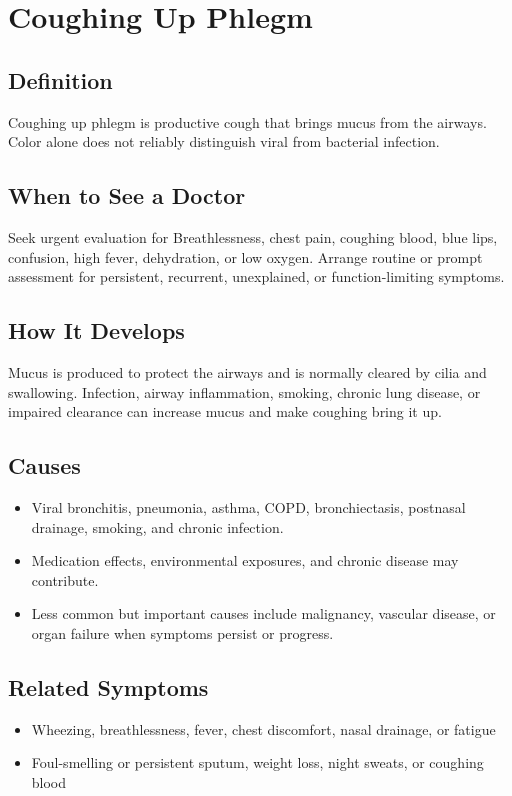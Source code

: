 \chapter{Coughing Up Phlegm}

\section*{Definition}
Coughing up phlegm is productive cough that brings mucus from the airways. Color alone does not reliably distinguish viral from bacterial infection.

\section*{When to See a Doctor}
Seek urgent evaluation for Breathlessness, chest pain, coughing blood, blue lips, confusion, high fever, dehydration, or low oxygen. Arrange routine or prompt assessment for persistent, recurrent, unexplained, or function-limiting symptoms.

\section*{How It Develops}
Mucus is produced to protect the airways and is normally cleared by cilia and swallowing. Infection, airway inflammation, smoking, chronic lung disease, or impaired clearance can increase mucus and make coughing bring it up.

\section*{Causes}
\begin{itemize}
  \item Viral bronchitis, pneumonia, asthma, COPD, bronchiectasis, postnasal drainage, smoking, and chronic infection.
  \item Medication effects, environmental exposures, and chronic disease may contribute.
  \item Less common but important causes include malignancy, vascular disease, or organ failure when symptoms persist or progress.
\end{itemize}

\section*{Related Symptoms}
\begin{itemize}
  \item Wheezing, breathlessness, fever, chest discomfort, nasal drainage, or fatigue
  \item Foul-smelling or persistent sputum, weight loss, night sweats, or coughing blood
\end{itemize}

